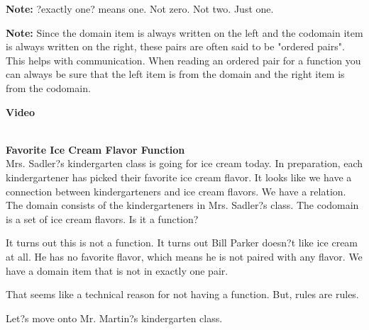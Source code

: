 \documentclass{ximera}
\begin{document}
\begin{observation} 
\textbf{Note:} ?exactly one? means one. Not zero. Not two. Just one.
\end{observation}

\begin{observation} 
\textbf{Note:} Since the domain item is always written on the left and the codomain item is always written on the right, these pairs are often said to be "ordered pairs". This helps with communication. When reading an ordered pair for a function you can always be sure that the left item is from the domain and the right item is from the codomain.
\end{observation}


\begin{explanation} \textbf{Video}
\begin{center}
\end{center}
\end{explanation}

\quad \\


\textbf{Favorite Ice Cream Flavor Function} \\

Mrs. Sadler?s kindergarten class is going for ice cream today.  In preparation, each kindergartener has picked their favorite ice cream flavor. It looks like we have a connection between kindergarteners and ice cream flavors.  We have a relation.  The domain consists of the kindergarteners in Mrs. Sadler?s class.  The codomain is a set of ice cream flavors. Is it a function?

It turns out this is not a function.  It turns out Bill Parker doesn?t like ice cream at all. He has no favorite flavor, which means he is not paired with any flavor.  We have a domain item that is not in exactly one pair.

That seems like a technical reason for not having a function.  But, rules are rules.  

Let?s move onto Mr. Martin?s kindergarten class.
\end{document}
